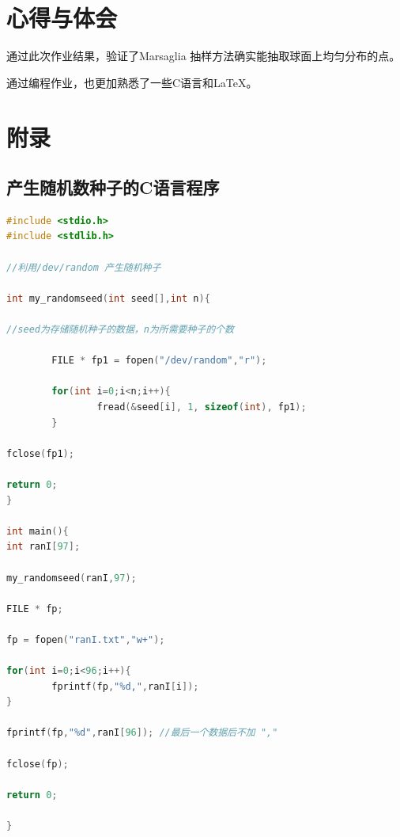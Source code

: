 \documentclass[a4paper,11pt]{article}
\begin{document}
\section{心得与体会}
通过此次作业结果，验证了Marsaglia 抽样方法确实能抽取球面上均匀分布的点。

通过编程作业，也更加熟悉了一些C语言和\LaTeX 。

\newpage
\section{附录}

\begin{appendices}



\section{产生随机数种子的C语言程序}
\begin{lstlisting}[language = C]
#include <stdio.h>
#include <stdlib.h>

//利用/dev/random 产生随机种子

int my_randomseed(int seed[],int n){

//seed为存储随机种子的数据，n为所需要种子的个数

		FILE * fp1 = fopen("/dev/random","r");

		for(int i=0;i<n;i++){
				fread(&seed[i], 1, sizeof(int), fp1);
		}

fclose(fp1);

return 0;
}

int main(){
int ranI[97];

my_randomseed(ranI,97);

FILE * fp;

fp = fopen("ranI.txt","w+");

for(int i=0;i<96;i++){
		fprintf(fp,"%d,",ranI[i]);
}

fprintf(fp,"%d",ranI[96]); //最后一个数据后不加 ","

fclose(fp);

return 0;

}	
\end{lstlisting}



\end{appendices}
\end{document}
